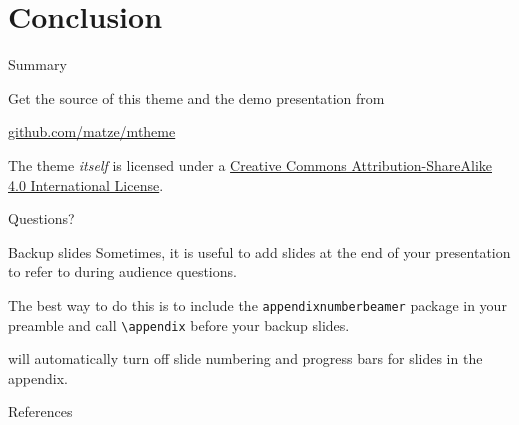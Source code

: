 \section{Conclusion}

\begin{frame}{Summary}

  Get the source of this theme and the demo presentation from

  \begin{center}\url{github.com/matze/mtheme}\end{center}

  The theme \emph{itself} is licensed under a
  \href{http://creativecommons.org/licenses/by-sa/4.0/}{Creative Commons
    Attribution-ShareAlike 4.0 International License}.

  \begin{center}\ccbysa\end{center}

\end{frame}

{
\begin{frame}[standout]
  Questions?
\end{frame}
}

\appendix

\begin{frame}[fragile]{Backup slides}
  Sometimes, it is useful to add slides at the end of your presentation to
  refer to during audience questions.

  The best way to do this is to include the \verb|appendixnumberbeamer| package
  in your preamble and call \verb|\appendix| before your backup slides.

  \themename will automatically turn off slide numbering and progress bars for
  slides in the appendix.
\end{frame}

\begin{frame}[allowframebreaks]{References}

  
  

\end{frame}